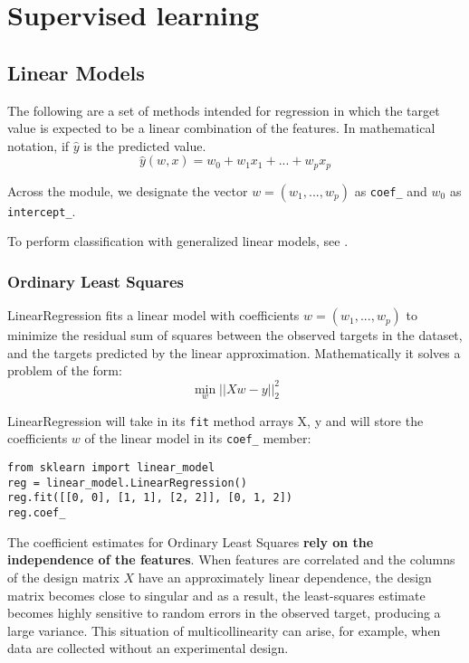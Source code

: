 \chapter{Supervised learning}
\section{Linear Models}
The following are a set of methods intended for regression in which the target value is expected to be a linear combination of the features. In mathematical notation, if $\hat{y}$ is the predicted value.
\begin{equation}
\hat{y}(w, x) = w_0 + w_1 x_1 + ... + w_p x_p
\end{equation}

Across the module, we designate the vector  $w = (w_1,
..., w_p)$ as \verb|coef_| and  $w_0$ as \verb|intercept_|.

To perform classification with generalized linear models, see .
\subsection{Ordinary Least Squares}
LinearRegression fits a linear model with coefficients $w = (w_1, ..., w_p)$ to minimize the residual sum of squares between the observed targets in the dataset, and the targets predicted by the linear approximation. Mathematically it solves a problem of the form:
\begin{equation}
\min_{w} || X w - y||_2^2
\end{equation}

LinearRegression will take in its \verb|fit| method arrays X, y and will store the coefficients $w$ of the linear model in its \verb|coef_| member:
\begin{verbatim}
from sklearn import linear_model
reg = linear_model.LinearRegression()
reg.fit([[0, 0], [1, 1], [2, 2]], [0, 1, 2])
reg.coef_
\end{verbatim}
The coefficient estimates for Ordinary Least Squares \textbf{rely on the independence of the features}. When features are correlated and the columns of the design matrix $X$ have an approximately linear dependence, the design matrix becomes close to singular and as a result, the least-squares estimate becomes highly sensitive to random errors in the observed target, producing a large variance. This situation of multicollinearity can arise, for example, when data are collected without an experimental design.

